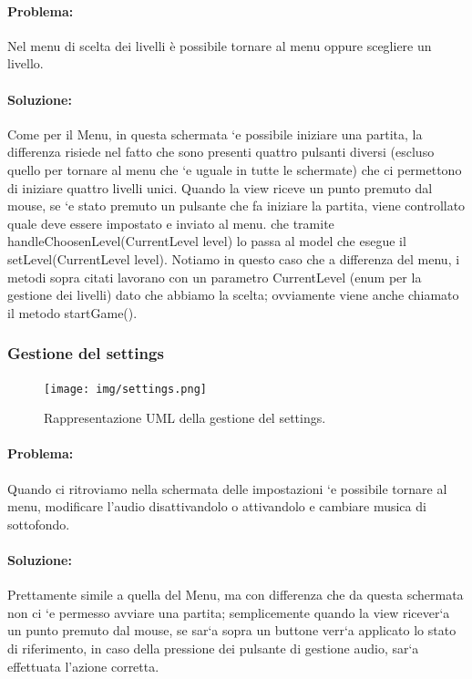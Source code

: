 \paragraph{Problema:}
Nel menu di scelta dei livelli è possibile tornare al menu oppure scegliere un livello.

\paragraph{Soluzione:}
Come per il Menu, in questa schermata `e possibile iniziare una partita, la differenza risiede nel fatto che sono presenti quattro pulsanti diversi (escluso quello per tornare al menu che `e uguale in tutte le schermate) che ci permettono di iniziare quattro livelli unici. Quando la view riceve un punto premuto dal mouse, se `e stato premuto un pulsante che fa iniziare la partita, viene controllato quale deve essere impostato e inviato al menu. che tramite handleChoosenLevel(CurrentLevel level) lo passa al model che esegue il setLevel(CurrentLevel level). Notiamo in questo caso che a differenza del menu, i metodi sopra citati lavorano con un parametro CurrentLevel (enum per la gestione dei livelli) dato che abbiamo la scelta; ovviamente viene anche chiamato il metodo startGame().

\subsubsection{Gestione del settings}

\begin{figure}[H]
\centering{}
\texttt{[image: img/settings.png]}
\caption{Rappresentazione UML della gestione del settings.}
\end{figure}

\paragraph{Problema:}
Quando ci ritroviamo nella schermata delle impostazioni `e possibile tornare al menu, modificare l’audio disattivandolo o attivandolo e cambiare musica di sottofondo.

\paragraph{Soluzione:}
Prettamente simile a quella del Menu, ma con differenza che da questa schermata non ci `e permesso avviare una partita; semplicemente quando la view ricever`a un punto premuto dal mouse, se sar`a sopra un buttone verr`a applicato lo stato di riferimento, in caso della pressione dei pulsante di gestione audio, sar`a effettuata l’azione corretta.

